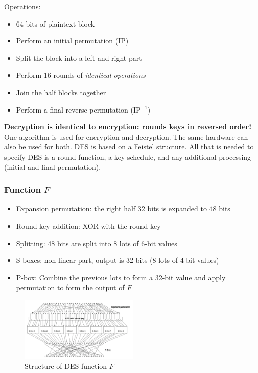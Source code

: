 Operations:
\begin{itemize}
    \item 64 bits of plaintext block
    \item Perform an initial permutation (IP)
    \item Split the block into a left and right part
    \item Perform 16 rounds of \emph{identical operations}
    \item Join the half blocks together
    \item Perform a final reverse permutation (IP$^{-1}$)
\end{itemize}

\textbf{Decryption is identical to encryption: rounds keys in reversed order!} One algorithm is used for encryption and decryption. The same hardware can also be used for both.
DES is based on a Feistel structure. All that is needed to specify DES is a round function, a key schedule, and any additional processing (initial and final permutation).

\subsubsection{Function \texorpdfstring{$F$}{F}}
\begin{itemize}
    \item Expansion permutation: the right half 32 bits is expanded to 48 bits
    \item Round key addition: XOR with the round key 
    \item Splitting: 48 bits are split into 8 lots of 6-bit values
    \item S-boxes: non-linear part, output is 32 bits (8 lots of 4-bit values)
    \item P-box: Combine the previous lots to form a 32-bit value and apply permutation to form the output of $F$
\end{itemize}


\begin{figure}[h!]
    \centering
    \includegraphics[width=0.5\textwidth]{img/desF.png}
    \caption{Structure of DES function \( F \)}
    \label{fig:f}
\end{figure}

